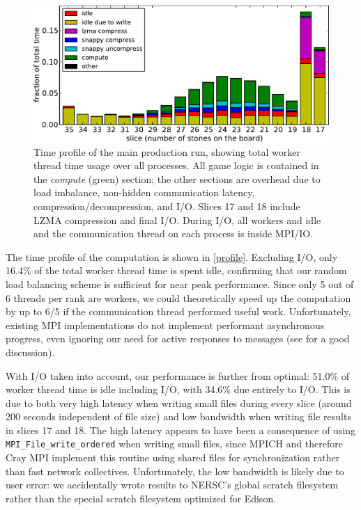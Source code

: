 \documentclass[conference]{IEEEtran}
\begin{document}
\begin{figure}
\begin{center}
\includegraphics[width=\columnwidth]{profile.pdf}
\end{center}
\vspace{-.1in}
\cprotect\caption{Time profile of the main production run, showing total worker thread time usage over
all processes.  All game logic is contained in the \emph{compute} (green) section; the other sections are
overhead due to load imbalance, non-hidden communication latency, compression/decompression, and I/O.
Slices 17 and 18 include LZMA compression and final I/O.  During I/O, all workers and idle and the communication
thread on each process is inside MPI/IO.}
\label{profile}
\end{figure}

The time profile of the computation is shown in \autoref{profile}.  Excluding I/O, only 16.4\% of the
total worker thread time is spent idle,
confirming that our random load balancing scheme is sufficient for near peak performance.  Since only 5
out of 6 threads per rank are workers, we could theoretically speed up the computation by up to 6/5 if
the communication thread performed useful work.  Unfortunately, existing MPI implementations do not
implement performant asynchronous progress, even ignoring our need for active responses to messages
(see \cite{squyres2012progress} for a good discussion).

With I/O taken into account, our performance is further from optimal: 51.0\% of worker thread time is
idle including I/O, with 34.6\% due entirely to I/O.  This is due to both very high latency when
writing small files during every slice (around 200 seconds independent of file size) and low bandwidth
when writing file results in slices 17 and 18.  The high latency appears to have been a consequence of
using \verb+MPI_File_write_ordered+ when writing small files, since MPICH and therefore Cray MPI
implement this routine using shared files for synchronization rather than fast network collectives.
Unfortunately, the low bandwidth is likely due to user error: we accidentally wrote results to NERSC's
global scratch filesystem rather than the special scratch filesystem optimized for Edison.
\end{document}
